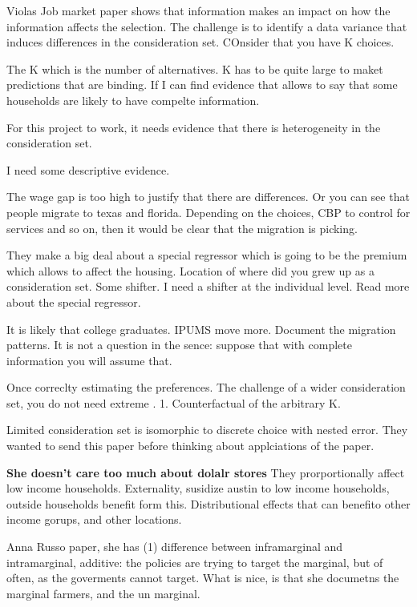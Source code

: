 \documentclass[11pt]{article}
\begin{document}
Violas Job market paper shows that information makes an impact on how the information affects the selection. The challenge is to identify a data variance that induces differences in the consideration set. COnsider that you have K choices.

The K which is the number of alternatives. K has to be quite large to maket predictions that are binding. If I can find evidence that allows to say that some households are likely to have compelte information.

For this project to work, it needs evidence that there is heterogeneity in the consideration set. 

I need some descriptive evidence. 

The wage gap is too high to justify that there are differences. Or you can see that people migrate to texas and florida. Depending on the choices, CBP to control for services and so on, then it would be clear that the migration is picking. 

They make a big deal about a special regressor which is going to be the premium which allows to affect the housing. Location of where did you grew up as a consideration set. Some shifter. I need a shifter at the individual level. Read more about the special regressor. 

It is likely that college graduates. IPUMS move more. Document the migration patterns. It is not a question in the sence: suppose that with complete information you will assume that.

Once correclty estimating the preferences. The challenge of a wider consideration set, you do not need extreme .
1. Counterfactual of the arbitrary K. 

Limited consideration set is isomorphic to discrete choice with nested error. They wanted to send this paper before thinking about applciations of the paper. 



\textbf{She doesn't care too much about dolalr stores}
They prorportionally affect low income households. Externality, susidize austin to low income households, outside households benefit form this. Distributional effects that can benefito other income gorups, and other locations. 

Anna Russo paper, she has (1) difference between inframarginal and intramarginal, additive: the policies are trying to target the marginal, but of often, as the goverments cannot target. What is nice, is that she documetns the marginal farmers, and the un marginal. 
\end{document}
